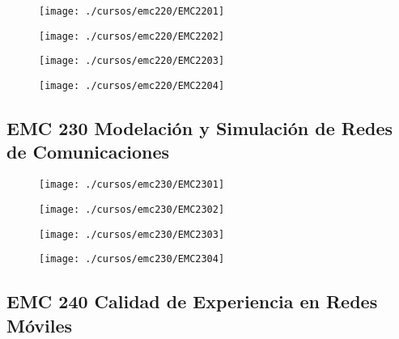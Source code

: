 \begin{figure}[!ht]
    \centering
    \texttt{[image: ./cursos/emc220/EMC2201]}
\end{figure}
\clearpage

\begin{figure}[!ht]
    \centering
    \texttt{[image: ./cursos/emc220/EMC2202]}
\end{figure}
\clearpage

\begin{figure}[!ht]
    \centering
    \texttt{[image: ./cursos/emc220/EMC2203]}
\end{figure}
\clearpage

\begin{figure}[!ht]
    \centering
    \texttt{[image: ./cursos/emc220/EMC2204]}
\end{figure}
\clearpage



\subsection{EMC 230 Modelación y Simulación de Redes de Comunicaciones} 





\begin{figure}[!ht]
    \centering
    \texttt{[image: ./cursos/emc230/EMC2301]}
\end{figure}
\clearpage

\begin{figure}[!ht]
    \centering
    \texttt{[image: ./cursos/emc230/EMC2302]}
\end{figure}
\clearpage

\begin{figure}[!ht]
    \centering
    \texttt{[image: ./cursos/emc230/EMC2303]}
\end{figure}
\clearpage

\begin{figure}[!ht]
    \centering
    \texttt{[image: ./cursos/emc230/EMC2304]}
\end{figure}
\clearpage




\subsection{EMC 240 Calidad de Experiencia en Redes Móviles} 



